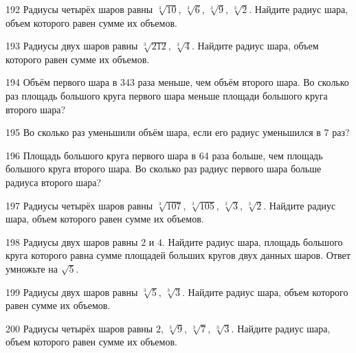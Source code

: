 \documentclass[a4paper]{article}
\begin{document}
\begin{taskBN}{192}
Радиусы четырёх шаров равны $\sqrt[3]{10}$, $\sqrt[3]{6}$, $\sqrt[3]{9}$, $\sqrt[3]{2}$. Найдите радиус шара, объем которого равен сумме их объемов.
\end{taskBN}

\begin{taskBN}{193}
Радиусы двух шаров равны $\sqrt[3]{212}$, $\sqrt[3]{4}$. Найдите радиус шара, объем которого равен сумме их объемов.
\end{taskBN}

\begin{taskBN}{194}
Объём первого шара в 343 раза меньше, чем объём второго шара. Во сколько раз площадь большого круга первого шара меньше площади большого круга второго шара?
\end{taskBN}

\begin{taskBN}{195}
Во сколько раз уменьшили объём шара, если его радиус уменьшился в 7 раз?
\end{taskBN}

\begin{taskBN}{196}
Площадь большого круга первого шара в 64 раза больше, чем площадь большого круга второго шара. Во сколько раз радиус первого шара больше радиуса второго шара?
\end{taskBN}

\begin{taskBN}{197}
Радиусы четырёх шаров равны $\sqrt[3]{107}$, $\sqrt[3]{105}$, $\sqrt[3]{3}$, $\sqrt[3]{2}$. Найдите радиус шара, объем которого равен сумме их объемов.
\end{taskBN}

\begin{taskBN}{198}
Радиусы двух шаров равны $2$ и $4$. Найдите радиус шара, площадь большого круга которого равна сумме площадей больших кругов двух данных шаров. Ответ умножьте на $\sqrt{5}$.
\end{taskBN}

\begin{taskBN}{199}
Радиусы двух шаров равны $\sqrt[3]{5}$, $\sqrt[3]{3}$. Найдите радиус шара, объем которого равен сумме их объемов.
\end{taskBN}

\begin{taskBN}{200}
Радиусы четырёх шаров равны $2$, $\sqrt[3]{9}$, $\sqrt[3]{7}$, $\sqrt[3]{3}$. Найдите радиус шара, объем которого равен сумме их объемов.
\end{taskBN}
\end{document}
